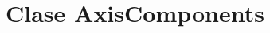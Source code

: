 \documentclass[../../main.tex]{subfiles}
\begin{document}
\normalsize





\section{Clase AxisComponents}


\footnotesize
\end{document}
